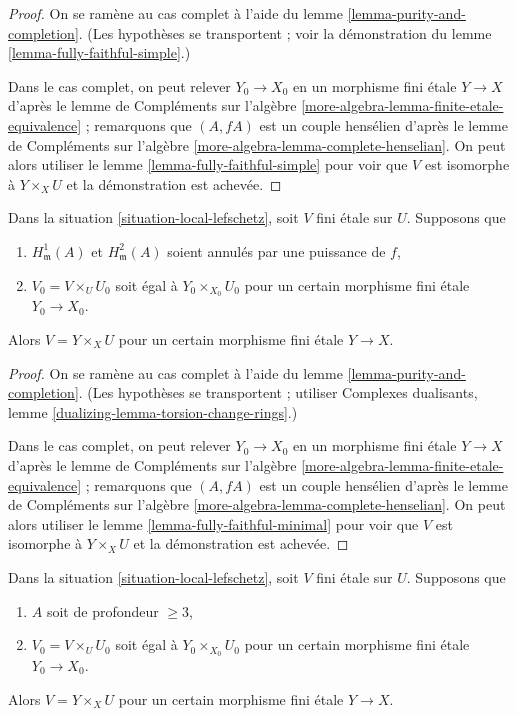 \begin{proof}
On se ramène au cas complet à l'aide du lemme \ref{lemma-purity-and-completion}.
(Les hypothèses se transportent ; voir la démonstration du
lemme \ref{lemma-fully-faithful-simple}.)

\medskip\noindent
Dans le cas complet, on peut relever $Y_0 \to X_0$ en un morphisme
fini étale $Y \to X$ d'après le
lemme de Compléments sur l'algèbre \ref{more-algebra-lemma-finite-etale-equivalence} ;
remarquons que $(A, fA)$ est un couple hensélien d'après le
lemme de Compléments sur l'algèbre \ref{more-algebra-lemma-complete-henselian}.
On peut alors utiliser le lemme \ref{lemma-fully-faithful-simple}
pour voir que $V$ est isomorphe à $Y \times_X U$ et
la démonstration est achevée.
\end{proof}

\begin{lemma}
\label{lemma-lift-purity-general}
Dans la situation \ref{situation-local-lefschetz},
soit $V$ fini étale sur $U$. Supposons que
\begin{enumerate}
\item $H^1_\mathfrak m(A)$ et $H^2_\mathfrak m(A)$
soient annulés par une puissance de $f$,
\item $V_0 = V \times_U U_0$ soit égal à $Y_0 \times_{X_0} U_0$
pour un certain morphisme fini étale $Y_0 \to X_0$.
\end{enumerate}
Alors $V = Y \times_X U$ pour un certain morphisme fini étale $Y \to X$.
\end{lemma}

\begin{proof}
On se ramène au cas complet à l'aide du lemme \ref{lemma-purity-and-completion}.
(Les hypothèses se transportent ; utiliser Complexes dualisants, lemme
\ref{dualizing-lemma-torsion-change-rings}.)

\medskip\noindent
Dans le cas complet, on peut relever $Y_0 \to X_0$ en un morphisme
fini étale $Y \to X$ d'après le
lemme de Compléments sur l'algèbre \ref{more-algebra-lemma-finite-etale-equivalence} ;
remarquons que $(A, fA)$ est un couple hensélien d'après le
lemme de Compléments sur l'algèbre \ref{more-algebra-lemma-complete-henselian}.
On peut alors utiliser le lemme \ref{lemma-fully-faithful-minimal}
pour voir que $V$ est isomorphe à $Y \times_X U$ et
la démonstration est achevée.
\end{proof}

\begin{lemma}
\label{lemma-lift-purity}
Dans la situation \ref{situation-local-lefschetz},
soit $V$ fini étale sur $U$. Supposons que
\begin{enumerate}
\item $A$ soit de profondeur $\geq 3$,
\item $V_0 = V \times_U U_0$ soit égal à $Y_0 \times_{X_0} U_0$
pour un certain morphisme fini étale $Y_0 \to X_0$.
\end{enumerate}
Alors $V = Y \times_X U$ pour un certain morphisme fini étale $Y \to X$.
\end{lemma}

